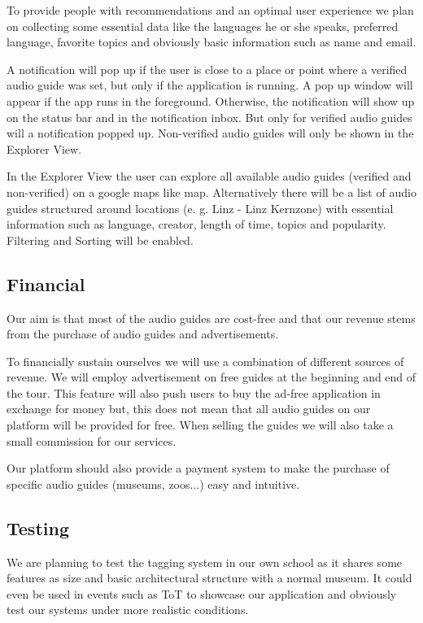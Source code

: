 \documentclass[12pt]{article}
\theoremstyle{definition}
\newenvironment{text}{
}{}
\begin{document}
\begin{text}
To provide people with recommendations and an optimal user experience we plan on collecting some essential data like the languages he or she speaks, preferred language, favorite topics and obviously basic information such as name and email.\newline
 
A notification will pop up if the user is close to a place or point where a verified audio guide was set, but only if the application is running. A pop up window will appear if the app runs in the foreground. Otherwise, the notification will show up on the status bar and in the notification inbox. But only for verified audio guides will a notification popped up. Non-verified audio guides will only be shown in the Explorer View.\newline
 
In the Explorer View the user can explore all available audio guides (verified and non-verified) on a google maps like map. Alternatively there will be a list of audio guides structured around locations (e. g. Linz - Linz Kernzone) with essential information such as language, creator, length of time, topics and popularity. Filtering and Sorting will be enabled.
\end{text}

\subsection{Financial}
\begin{text} 
Our aim is that most of the audio guides are cost-free and that our revenue stems from the purchase of audio guides and advertisements.\newline

To financially sustain ourselves we will use a combination of different sources of revenue. We will employ advertisement on free guides at the beginning and end of the tour. This feature will also push users to buy the ad-free application in exchange for money but, this does not mean that all audio guides on our platform will be provided for free. When selling the guides we will also take a small commission for our services.\newline

Our platform should also provide a payment system to make the purchase of specific audio guides (museums, zoos...) easy and intuitive. 
\end{text}

\subsection{Testing}
\begin{text}
We are planning to test the tagging system in our own school as it shares some features as size and basic architectural structure with a normal museum. It could even be used in events such as ToT to showcase our application and obviously test our systems under more realistic conditions.\newline
\end{text}
 
\end{document}
